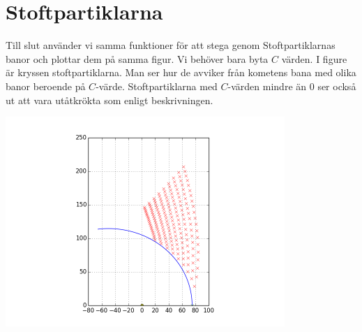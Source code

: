 \documentclass[11pt,twoside]{article}
\begin{document}
\section{Stoftpartiklarna}

Till slut använder vi samma funktioner för att stega genom Stoftpartiklarnas banor och plottar dem på samma figur. Vi behöver bara byta $C$ värden.
I figure är kryssen stoftpartiklarna. Man ser hur de avviker från kometens bana med olika banor beroende på $C$-värde. Stoftpartiklarna med $C$-värden mindre än 0 ser också
ut att vara utåtkrökta som enligt beskrivningen.

\includegraphics[width=300pt]{imgs/svans.png}
\end{document}
